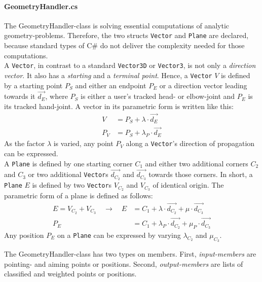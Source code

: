 \paragraph{GeometryHandler.cs} The GeometryHandler-class is solving essential computations of analytic geometry-problems. Therefore, the two structs \texttt{Vector} and \texttt{Plane} are declared, because standard types of C$\#$ do not deliver the complexity needed for those computations.
\\
A \texttt{Vector}, in contrast to a standard \texttt{Vector3D} or \texttt{Vector3}, is not only a \textit{direction vector}. It also has a \textit{starting} and a \textit{terminal point}. Hence, a \texttt{Vector} $V$ is defined by a starting point $P_{S}$ and either an endpoint $P_{E}$ or a direction vector leading towards it $\overrightarrow{d_{E}}$, where $P_{S}$ is either a user's tracked head- or elbow-joint and $P_{E}$ is its tracked hand-joint. A vector in its parametric form is written like this:
\begin{align*}
	V &= P_{S} + \lambda \cdot \overrightarrow{d_{E}} \\
	P_{V} &= P_{S} + \lambda_{P} \cdot \overrightarrow{d_{E}}
\end{align*}
As the factor $\lambda$ is varied, any point $P_{V}$ along a \texttt{Vector}'s direction of propagation can be expressed. 
\\
A \texttt{Plane} is defined by one starting corner $C_{1}$ and either two additional corners $C_{2}$ and $C_{3}$ or two additional \texttt{Vector}s $\overrightarrow{d_{C_{2}}}$ and $\overrightarrow{d_{C_{3}}}$ towards those corners. In short, a \texttt{Plane} $E$ is defined by two \texttt{Vector}s $V_{C_{2}}$ and $V_{C_{3}}$ of identical origin. The parametric form of a plane is defined as follows: 
\begin{align*}
	E = V_{C_{2}} + V_{C_{3}} \quad \to \quad E &= C_{1} + \lambda \cdot \overrightarrow{d_{C_{2}}} + \mu \cdot \overrightarrow{d_{C_{3}}} \\
	P_{E} &= C_{1} + \lambda_{P} \cdot \overrightarrow{d_{C_{2}}} + \mu_{P} \cdot \overrightarrow{d_{C_{3}}}
\end{align*}
Any position $P_{E}$ on a \texttt{Plane} can be expressed by varying $\lambda_{C_{2}}$ and $\mu_{C_{3}}$.

The GeometryHandler-class has two types on members. First, \textit{input-members} are pointing- and aiming points or positions. Second, \textit{output-members} are lists of classified and weighted points or positions.

